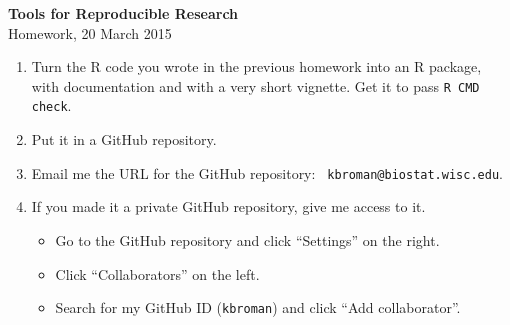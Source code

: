 \documentclass[12pt]{article}
\newcommand{\ttsm}{\tt \small}
\begin{document}
\thispagestyle{empty}

\textbf{Tools for Reproducible Research} \\
Homework, 20 March 2015

\bigskip

\begin{enumerate}
\item Turn the R code you wrote in the previous homework into an
R package, with documentation and with a very short
vignette. Get it to pass {\ttsm R CMD check}.

\item Put it in a GitHub repository.

\item Email me the URL for the GitHub repository: {\ttsm
  kbroman@biostat.wisc.edu}.

\item If you made it a private GitHub repository, give me access to
  it.
  \begin{itemize}
  \item Go to the GitHub repository and click ``Settings'' on the
    right.
  \item Click ``Collaborators'' on the left.
  \item Search for my GitHub ID ({\ttsm kbroman}) and click ``Add
    collaborator''.
  \end{itemize}


\end{enumerate}
\end{document}
